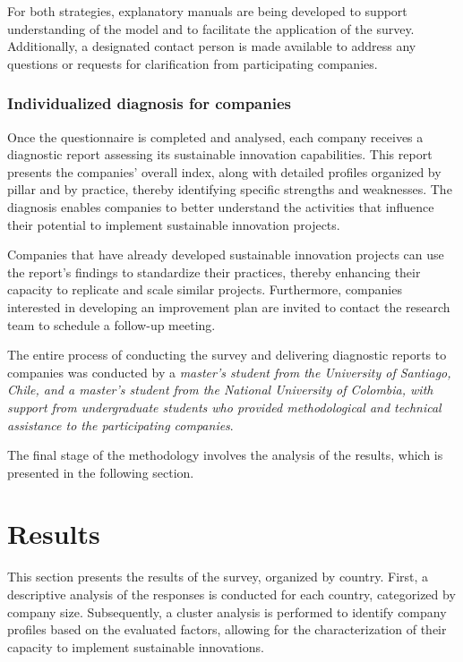 \documentclass[
  12pt,
  oneside]{book}
\begin{document}
For both strategies, explanatory manuals are being developed to support
understanding of the model and to facilitate the application of the
survey. Additionally, a designated contact person is made available to
address any questions or requests for clarification from participating
companies.

\subsection{Individualized diagnosis for
companies}\label{individualized-diagnosis-for-companies}

Once the questionnaire is completed and analysed, each company receives
a diagnostic report assessing its sustainable innovation capabilities.
This report presents the companies' overall index, along with detailed
profiles organized by pillar and by practice, thereby identifying
specific strengths and weaknesses. The diagnosis enables companies to
better understand the activities that influence their potential to
implement sustainable innovation projects.

Companies that have already developed sustainable innovation projects
can use the report's findings to standardize their practices, thereby
enhancing their capacity to replicate and scale similar projects.
Furthermore, companies interested in developing an improvement plan are
invited to contact the research team to schedule a follow-up meeting.

The entire process of conducting the survey and delivering diagnostic
reports to companies was conducted by a \emph{master's student from the
University of Santiago, Chile, and a master's student from the National
University of Colombia, with support from undergraduate students who
provided methodological and technical assistance to the participating
companies}.

The final stage of the methodology involves the analysis of the results,
which is presented in the following section.

\chapter{Results}\label{results}

This section presents the results of the survey, organized by country.
First, a descriptive analysis of the responses is conducted for each
country, categorized by company size. Subsequently, a cluster analysis
is performed to identify company profiles based on the evaluated
factors, allowing for the characterization of their capacity to
implement sustainable innovations.
\end{document}
